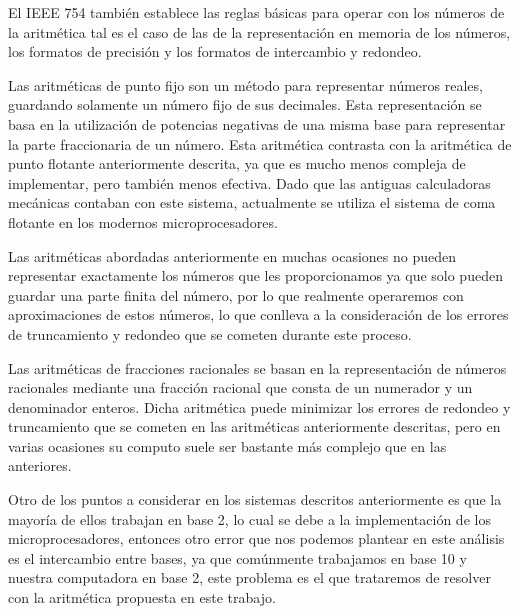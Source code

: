 \documentclass[a4paper,10pt,twocolumn]{article}
\begin{document}
	El IEEE 754 también establece las reglas básicas para operar con los números de la aritmética tal es el caso de las de la representación en memoria de los números, los formatos de precisión y los formatos de intercambio y redondeo.
  
	Las aritméticas de punto fijo son un método para representar números reales, guardando solamente un número fijo de sus decimales. Esta representación se basa en la utilización de potencias negativas de una misma base para representar la parte fraccionaria de un número. Esta aritmética contrasta con la aritmética de punto flotante anteriormente descrita, ya que es mucho menos compleja de implementar, pero también menos efectiva. Dado que las antiguas calculadoras mecánicas contaban con este sistema, actualmente se utiliza el sistema de coma flotante en los modernos microprocesadores.
  
	Las aritméticas abordadas anteriormente en muchas ocasiones no pueden representar exactamente los números que les proporcionamos ya que solo pueden guardar una parte finita del número, por lo que realmente operaremos con aproximaciones de estos números, lo que conlleva a la consideración de los errores de truncamiento y redondeo que se cometen durante este proceso.
  
	Las aritméticas de fracciones racionales se basan en la representación de números racionales mediante una fracción racional que consta de un numerador y un denominador enteros. Dicha aritmética puede minimizar los errores de redondeo y truncamiento que se cometen en las aritméticas anteriormente descritas, pero en varias ocasiones su computo suele ser bastante más complejo que en las anteriores.
  
	Otro de los puntos a considerar en los sistemas descritos anteriormente es que la mayoría de ellos trabajan en base 2, lo cual se debe a la implementación de los microprocesadores, entonces otro error que nos podemos plantear en este análisis es el intercambio entre bases, ya que comúnmente trabajamos en base 10 y nuestra computadora en base 2, este problema es el que trataremos de resolver con la aritmética propuesta en este trabajo.

  
  



\end{document}
